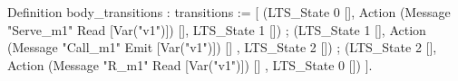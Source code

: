 Definition body_transitions : transitions :=
  [ (LTS_State 0 [], Action (Message "Serve_m1" Read [Var("v1")]) [], LTS_State 1 []) ;
    (LTS_State 1 [], Action (Message "Call_m1" Emit [Var("v1")]) [] , LTS_State 2 []) ;
    (LTS_State 2 [], Action (Message "R_m1" Read [Var("v1")]) []    , LTS_State 0 []) 
  ].